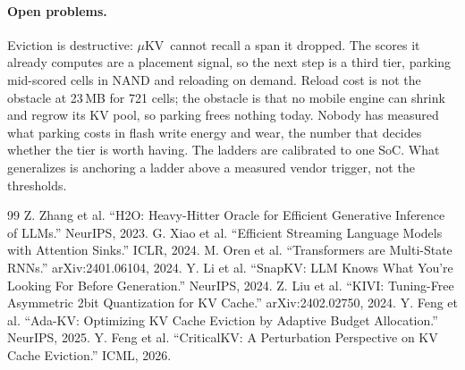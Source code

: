 \documentclass[sigconf, anonymous=false, screen=true, 10pt]{acmart}
\newcommand{\muKV}{$\mu$KV}
\begin{document}
\paragraph{Open problems.} Eviction is destructive: \muKV\ cannot recall a span it dropped. The scores it already computes are a placement signal, so the next step is a third tier, parking mid-scored cells in NAND and reloading on demand. Reload cost is not the obstacle at 23\,MB for 721 cells; the obstacle is that no mobile engine can shrink and regrow its KV pool, so parking frees nothing today. Nobody has measured what parking costs in flash write energy and wear, the number that decides whether the tier is worth having. The ladders are calibrated to one SoC. What generalizes is anchoring a ladder above a measured vendor trigger, not the thresholds.

\begin{thebibliography}{99}
\small
{} Z. Zhang et al. ``H2O: Heavy-Hitter Oracle for Efficient Generative Inference of LLMs.'' NeurIPS, 2023.
 G. Xiao et al. ``Efficient Streaming Language Models with Attention Sinks.'' ICLR, 2024.
 M. Oren et al. ``Transformers are Multi-State RNNs.'' arXiv:2401.06104, 2024.
 Y. Li et al. ``SnapKV: LLM Knows What You're Looking For Before Generation.'' NeurIPS, 2024.
 Z. Liu et al. ``KIVI: Tuning-Free Asymmetric 2bit Quantization for KV Cache.'' arXiv:2402.02750, 2024.
 Y. Feng et al. ``Ada-KV: Optimizing KV Cache Eviction by Adaptive Budget Allocation.'' NeurIPS, 2025.
 Y. Feng et al. ``CriticalKV: A Perturbation Perspective on KV Cache Eviction.'' ICML, 2026.



\end{thebibliography}
\end{document}
